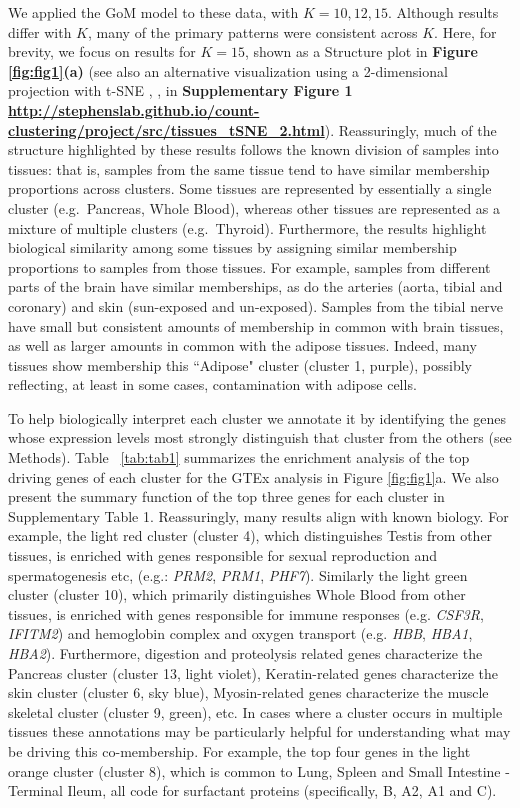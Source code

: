 We applied the GoM model to these data, with $K=10,12,15$. Although results differ with $K$, many of the primary patterns were consistent across $K$. Here, for brevity, we focus on results for $K=15$, shown as a Structure plot in \textbf{Figure \ref{fig:fig1}(a)} (see also an alternative visualization using a 2-dimensional projection with t-SNE \cite{Maaten2008}, \cite{Maaten2014}, in \textbf{Supplementary Figure 1 \url{http://stephenslab.github.io/count-clustering/project/src/tissues_tSNE_2.html}}). Reassuringly, much of the structure highlighted by these results follows the known division of samples into tissues: that is, samples from the same tissue tend to have similar membership proportions across clusters. Some tissues are represented by essentially a single cluster (e.g.~Pancreas, Whole Blood), whereas other tissues are represented as a mixture of multiple clusters (e.g.~Thyroid). Furthermore, the results highlight biological similarity among some tissues by assigning similar membership proportions to samples from those tissues.  For example, samples from different parts of the brain have similar memberships, as do the arteries (aorta, tibial and coronary) and skin (sun-exposed and un-exposed). 
 Samples from the tibial nerve have small but consistent amounts of membership in common with brain tissues, as well as larger amounts in common with the adipose tissues. Indeed, many tissues show membership this ``Adipose" cluster (cluster 1, purple), possibly reflecting, at least in some cases, contamination with adipose cells.

To help biologically interpret each cluster we annotate it by identifying the genes whose expression levels most strongly distinguish that cluster from the others (see Methods).  Table ~\ref{tab:tab1} summarizes the enrichment analysis of the top driving genes of each cluster for the GTEx analysis in Figure \ref{fig:fig1}a.  We also present the summary function of the top three genes for each cluster in Supplementary Table 1. Reassuringly, many results align with known biology. For example,  the light red cluster (cluster 4), which distinguishes Testis from other tissues, is enriched with  
genes responsible for sexual reproduction and spermatogenesis etc, (e.g.: \textit{PRM2}, \textit{PRM1}, \textit{PHF7}). Similarly the light green cluster (cluster 10), which primarily distinguishes Whole Blood from other tissues, is enriched with genes responsible for immune responses (e.g. \textit{CSF3R}, \textit{IFITM2}) and hemoglobin complex and oxygen transport (e.g. \textit{HBB}, \textit{HBA1}, \textit{HBA2}). Furthermore, digestion and proteolysis related genes characterize the Pancreas cluster (cluster 13, light violet), Keratin-related genes characterize the skin cluster (cluster 6, sky blue), Myosin-related genes characterize the muscle skeletal cluster (cluster 9, green), etc. In cases where a cluster occurs in multiple tissues these annotations may be particularly helpful for understanding what may be driving this co-membership. For example, the top four genes in the  light orange cluster (cluster 8), which is common to Lung, Spleen and Small Intestine - Terminal Ileum,  all code for surfactant proteins (specifically, B, A2, A1 and C).


